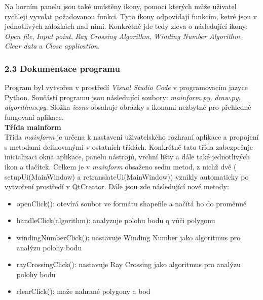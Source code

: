 \noindent Na horním panelu jsou také umístěny ikony, pomocí kterých může uživatel rychleji vyvolat požadovanou funkci. Tyto ikony odpovídají funkcím, ketré jsou v jednotlivých záložkách nad nimi. Konkrétně jde tedy zleva o následující ikony: \textit{Open file}, \textit{Input point}, \textit{Ray Crossing Algorithm}, \textit{Winding Number Algorithm}, \textit{Clear data} a \textit{Close application}.

\subsubsection*{2.3 Dokumentace programu}

\noindent Program byl vytvořen v prostředí \textit{Visual Studio Code} v programovacím jazyce Python. Součástí programu jsou následující soubory: \textit{mainform.py, draw.py, algorithms.py}. Složka \textit{icons} obsahuje obrázky s ikonami nezbytné pro přehledné fungovaní aplikace.\\

\noindent
\textbf{Třída mainform}\\
Třída \textit{mainform} je určena k nastavení uživatelského rozhraní aplikace a propojení s metodami definovanými v ostatních třídách. Konkrétně tato třída zabezpečuje inicializaci okna aplikace, panelu nástrojů, vrchní lišty a dále také jednotlivých ikon a tlačítek. Celkem je v \textit{mainform} obsaženo sedm metod, z nichž dvě ({\selectfont
setupUi(MainWindow)} a {\selectfont
retranslateUi(MainWindow)}) vznikly automaticky po vytvoření prostředí v QtCreator. Dále jsou zde následující nové metody:
\begin{itemize}
    \item {\selectfont
openClick()}: otevírá soubor ve formátu shapefile a načítá ho do proměnné
    \item {\selectfont
handleClick(algorithm)}: analyzuje polohu bodu q vůči polygonu
    \item {\selectfont
windingNumberClick()}: nastavuje Winding Number jako algoritmus pro analýzu polohy bodu
    \item {\selectfont
rayCrossingClick()}: nastavuje Ray Crossing jako algoritmus pro analýzu polohy bodu
    \item {\selectfont
clearClick()}: maže nahrané polygony a bod
\end{itemize}

